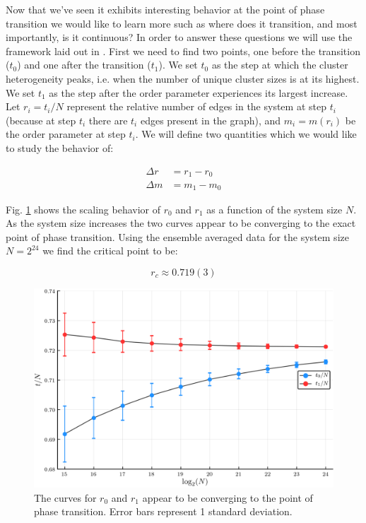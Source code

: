 Now that we've seen it exhibits interesting behavior at the point of phase transition we would like to learn more such as where does it transition, and most importantly, is it continuous?
In order to answer these questions we will use the framework laid out in \cite{Lee_1}.
First we need to find two points, one before the transition ($t_0$) and one after the transition ($t_1$).
We set $t_0$ as the step at which the cluster heterogeneity peaks, i.e. when the number of unique cluster sizes is at its highest.
We set $t_1$ as the step after the order parameter experiences its largest increase.
Let $r_i = t_i / N$ represent the relative number of edges in the system at step $t_i$ (because at step $t_i$ there are $t_i$ edges present in the graph), and $m_i = m(r_i)$ be the order parameter at step $t_i$.
We will define two quantities which we would like to study the behavior of:

\begin{equation}
\begin{split}
	\Delta r &= r_1 - r_0 \\
	\Delta m &= m_1 - m_0
\end{split}
\end{equation}

Fig. \ref{fig:r_scaling} shows the scaling behavior of $r_0$ and $r_1$ as a function of the system size $N$.
As the system size increases the two curves appear to be converging to the exact point of phase transition.
Using the ensemble averaged data for the system size $N = 2^{24}$ we find the critical point to be:

\begin{equation}
	r_c \approx 0.719(3)
\end{equation}

\begin{figure}[H]
	\centering
	\includegraphics[width=350pt, clip]{images/r_scaling.png}
	\caption{The curves for $r_0$ and $r_1$ appear to be converging to the point of phase transition. Error bars represent 1 standard deviation.}
	\label{fig:r_scaling}
\end{figure}

